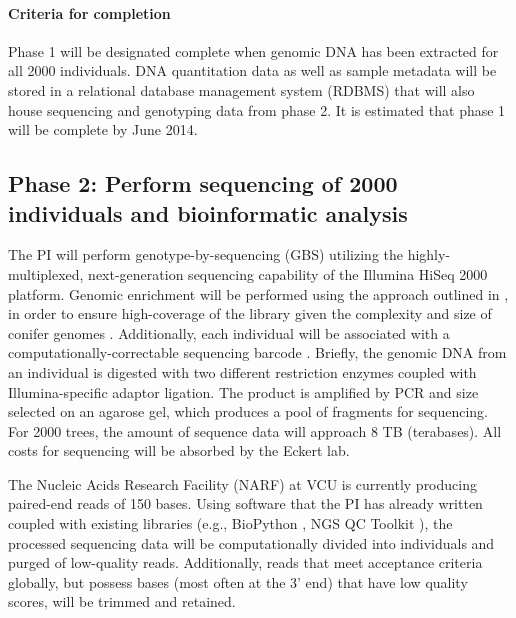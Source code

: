 \paragraph{Criteria for completion}
Phase 1 will be designated complete when genomic DNA has been extracted for all \num{2000} individuals.  
DNA quantitation data as well as sample metadata will be stored in a relational database management system (RDBMS) 
that will also house sequencing and genotyping data from phase 2.  It is estimated that phase 1 will be complete by June 2014.

\subsection*{Phase 2: Perform sequencing of 2000 individuals and bioinformatic analysis}

The PI will perform genotype-by-sequencing (GBS) utilizing the highly-multiplexed, next-generation sequencing capability of the 
Illumina HiSeq 2000 platform.  Genomic enrichment will be performed using the approach outlined in 
\cite{Parchman:2012ca}, in order to ensure high-coverage of the library given the complexity and size of conifer genomes 
\citep{Mackay:2012hr}.  Additionally, each individual will be associated with a computationally-correctable sequencing 
barcode \citep{Roche454MID}.  
Briefly, the genomic DNA from an individual is digested with two different restriction enzymes coupled with Illumina-specific 
adaptor ligation.  The product is amplified by PCR and size selected on an agarose gel, which produces a pool of fragments for 
sequencing.  For 2000 trees, the amount of sequence data will approach 8 TB (terabases).  All costs for sequencing will be 
absorbed by the Eckert lab.   

The Nucleic Acids Research Facility (NARF) at VCU is currently producing paired-end reads of 150 bases.  Using software that the 
PI has already written \citep{code:2008wq} coupled with existing libraries (e.g., BioPython \citep{Cock:2009hj}, NGS QC Toolkit 
\citep{Patel:2012fq}), the processed sequencing data will be computationally divided into individuals and purged of 
low-quality reads. Additionally, reads that meet acceptance criteria globally, but possess bases (most often at the 3' end) 
that have low quality scores, will be trimmed and retained.

